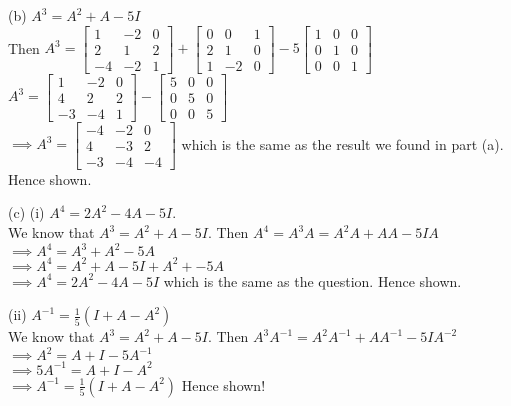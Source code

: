 \documentclass[addpoints]{exam}
\begin{document}
\begin{sloppypar}
\begin{questions}
\begin{solution}
        \vspace{2mm}
        (b) $ A^3 = A^2 + A - 5I $ \\ 
        Then $ A^3 = \begin{bmatrix}
            1 & -2 & 0 \\ 2 & 1 & 2 \\ -4 & -2 & 1
        \end{bmatrix} + \begin{bmatrix}
            0 & 0 & 1 \\ 2 & 1 & 0 \\ 1 & -2 & 0
        \end{bmatrix} - 5\begin{bmatrix}
            1 & 0 & 0 \\ 0 & 1 & 0 \\ 0 & 0 & 1
        \end{bmatrix}$ \\ 
        $ A^3 = \begin{bmatrix}
            1 & -2 & 0 \\ 4 & 2 & 2 \\ -3 & -4 & 1
        \end{bmatrix} - \begin{bmatrix}
            5 & 0 & 0 \\ 0 & 5 & 0 \\ 0 & 0 & 5
        \end{bmatrix}$ \\ 
        $ \implies A^3 = \begin{bmatrix}
            -4 & -2 & 0 \\ 4 & -3 & 2 \\ -3 & -4 & -4
        \end{bmatrix} $ which is the same as the result we found in part (a). Hence shown. 

        \vspace{2mm}
        (c) (i) $ A^4 = 2A^2 -4A -5I $. \\ 
        We know that $ A^3 = A^2 + A - 5I $. Then $ A^4 = A^3A = A^2A + AA - 5IA$ \\ 
        $ \implies A^4 = A^3 + A^2 - 5A $ \\ 
        $ \implies A^4 = A^2 + A - 5I + A^2 + - 5A $ \\ 
        $ \implies A^4 = 2A^2 - 4A - 5I $ which is the same as the question. Hence shown. 

        \vspace{1mm}
        (ii) $ A^{-1} = \frac{1}{5}(I + A - A^2) $ \\ 
        We know that $ A^3 = A^2 + A - 5I $. Then $ A^3A^{-1} = A^2A^{-1} + AA^{-1} -5IA^{-2} $ \\ 
        $ \implies A^2 = A + I -5A^{-1} $ \\ 
        $ \implies 5A^{-1} = A + I - A^2 $ \\ 
        $ \implies A^{-1} = \frac{1}{5}(I + A - A^2) $ Hence shown!
    \end{solution}


\end{questions}
\end{sloppypar}
\end{document}
